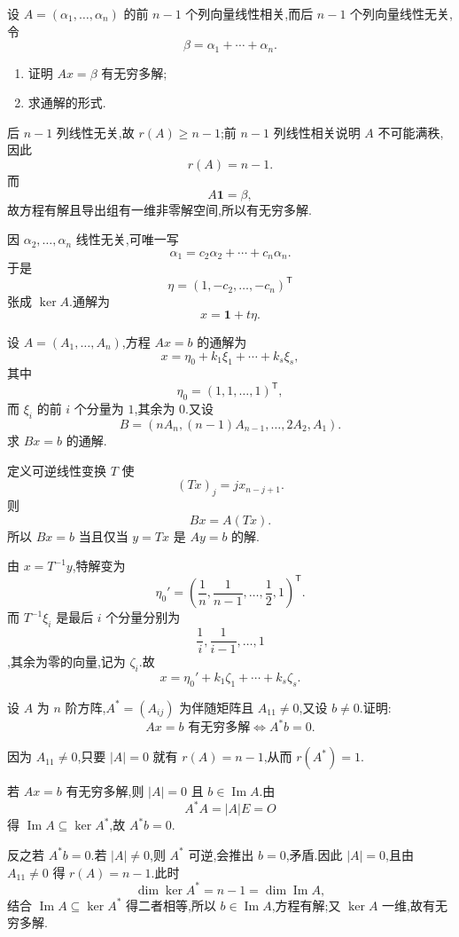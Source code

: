 \begin{example}
设 $A=(\alpha_1,\ldots,\alpha_n)$ 的前 $n-1$ 个列向量线性相关,而后 $n-1$ 个列向量线性无关,令
\[
\beta=\alpha_1+\cdots+\alpha_n.
\]
\begin{enumerate}
  \item 证明 $Ax=\beta$ 有无穷多解;
  \item 求通解的形式.
\end{enumerate}
\end{example}
\exampleblank

\begin{solution}
后 $n-1$ 列线性无关,故 $r(A)\geq n-1$;前 $n-1$ 列线性相关说明 $A$ 不可能满秩,因此
\[
r(A)=n-1.
\]
而
\[
A\boldsymbol{1}=\beta,
\]
故方程有解且导出组有一维非零解空间,所以有无穷多解.

因 $\alpha_2,\ldots,\alpha_n$ 线性无关,可唯一写
\[
\alpha_1=c_2\alpha_2+\cdots+c_n\alpha_n.
\]
于是
\[
\eta=(1,-c_2,\ldots,-c_n)^{\mathsf T}
\]
张成 $\ker A$.通解为
\[
\boxed{x=\boldsymbol{1}+t\eta}.
\]
\end{solution}

\begin{example}
设 $A=(A_1,\ldots,A_n)$,方程 $Ax=b$ 的通解为
\[
x=\eta_0+k_1\xi_1+\cdots+k_s\xi_s,
\]
其中
\[
\eta_0=(1,1,\ldots,1)^{\mathsf T},
\]
而 $\xi_i$ 的前 $i$ 个分量为 $1$,其余为 $0$.又设
\[
B=(nA_n,(n-1)A_{n-1},\ldots,2A_2,A_1).
\]
求 $Bx=b$ 的通解.
\end{example}
\exampleblank

\begin{solution}
定义可逆线性变换 $T$ 使
\[
(Tx)_j=jx_{n-j+1}.
\]
则
\[
Bx=A(Tx).
\]
所以 $Bx=b$ 当且仅当 $y=Tx$ 是 $Ay=b$ 的解.

由 $x=T^{-1}y$,特解变为
\[
\eta_0'=\left(\dfrac1n,\dfrac1{n-1},\ldots,\dfrac12,1\right)^{\mathsf T}.
\]
而 $T^{-1}\xi_i$ 是最后 $i$ 个分量分别为
\[
\dfrac1i,\dfrac1{i-1},\ldots,1
\]
,其余为零的向量,记为 $\zeta_i$.故
\[
\boxed{x=\eta_0'+k_1\zeta_1+\cdots+k_s\zeta_s}.
\]
\end{solution}

\begin{example}
设 $A$ 为 $n$ 阶方阵,$A^*=(A_{ij})$ 为伴随矩阵且 $A_{11}\neq0$,又设 $b\neq0$.证明:
\[
Ax=b\text{ 有无穷多解}
\iff
A^*b=0.
\]
\end{example}
\exampleblank

\begin{solution}
因为 $A_{11}\neq0$,只要 $|A|=0$ 就有 $r(A)=n-1$,从而 $r(A^*)=1$.

若 $Ax=b$ 有无穷多解,则 $|A|=0$ 且 $b\in\operatorname{Im}A$.由
\[
A^*A=|A|E=O
\]
得 $\operatorname{Im}A\subseteq\ker A^*$,故 $A^*b=0$.

反之若 $A^*b=0$.若 $|A|\neq0$,则 $A^*$ 可逆,会推出 $b=0$,矛盾.因此 $|A|=0$,且由 $A_{11}\neq0$ 得 $r(A)=n-1$.此时
\[
\dim\ker A^*=n-1=\dim\operatorname{Im}A,
\]
结合 $\operatorname{Im}A\subseteq\ker A^*$ 得二者相等,所以 $b\in\operatorname{Im}A$,方程有解;又 $\ker A$ 一维,故有无穷多解.
\end{solution}

